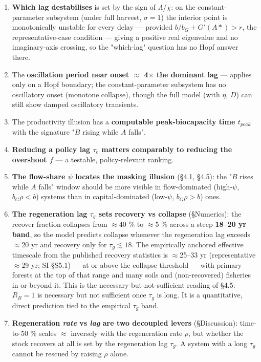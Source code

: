 \documentclass[11pt]{article}
\begin{document}
\begin{enumerate}
\item \textbf{Which lag destabilises} is set by the sign of $\Lambda{}$/$\chi{}$: on the constant-parameter subsystem (under full harvest, $\sigma{} = 1$) the interior point is monotonically unstable for every delay — provided $b/b_{G} + G\prime{}(A*) > r$, the representative-case condition — giving a positive real eigenvalue and no imaginary-axis crossing, so the "which-lag" question has no Hopf answer there.
\item The \textbf{oscillation period near onset \ensuremath{\approx{}} 4\ensuremath{\times{}} the dominant lag} — applies only on a Hopf boundary; the constant-parameter subsystem has no oscillatory onset (monotone collapse), though the full model (with $\eta{}$, $D$) can still show damped oscillatory transients.
\item The productivity illusion has a \textbf{computable peak-biocapacity time $t_{peak}$} with the signature "$B$ rising while $A$ falls".
\item \textbf{Reducing a policy lag $\tau{}_{e}$ matters comparably to reducing the overshoot $f$} — a testable, policy-relevant ranking.
\item \textbf{The flow-share $\psi{}$ locates the masking illusion} (§4.1, §4.5): the "$B$ rises while $A$ falls" window should be more visible in flow-dominated (high-$\psi{}$, $b_{G}\rho{} < b$) systems than in capital-dominated (low-$\psi{}$, $b_{G}\rho{} > b$) ones.
\item \textbf{The regeneration lag $\tau{}_{g}$ sets recovery vs collapse} (§Numerics): the recover fraction collapses from \ensuremath{\approx{}}40 \% to \ensuremath{\approx{}}5 \% across a steep \textbf{18–20 yr band}, so the model predicts collapse whenever the regeneration lag exceeds \ensuremath{\approx{}}20 yr and recovery only for $\tau{}_{g} \lesssim{} 18$. The empirically anchored effective timescale from the published recovery statistics is \ensuremath{\approx{}}25–33 yr (representative \ensuremath{\approx{}}29 yr; SI §S5.1) — at or above the collapse threshold — with primary forests at the top of that range and many soils and (non-recovered) fisheries in or beyond it. This is the necessary-but-not-sufficient reading of §4.5: $R_{B} = 1$ is necessary but not sufficient once $\tau{}_{g}$ is long. It is a quantitative, direct prediction tied to the empirical $\tau{}_{g}$ band.
\item \textbf{Regeneration \emph{rate} vs \emph{lag} are two decoupled levers} (§Discussion): time-to-50 \% scales \ensuremath{\approx{}} inversely with the regeneration rate $\rho{}$, but whether the stock recovers at all is set by the regeneration lag $\tau{}_{g}$. A system with a long $\tau{}_{g}$ cannot be rescued by raising $\rho{}$ alone.

\end{enumerate}
\end{document}
